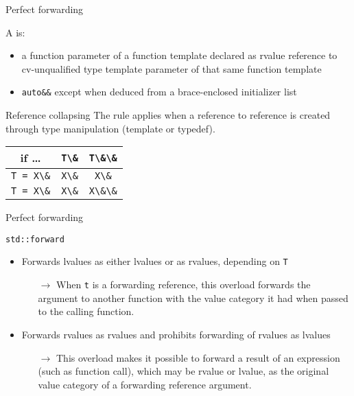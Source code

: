 \begin{frame}{Perfect forwarding}{}
  \begin{definition}
    A  is:
    \begin{itemize}
    \item
      a function parameter of a function template declared as rvalue reference to cv-unqualified type template parameter of that same function template
    \item
      \lstinline!auto&&! except when deduced from a brace-enclosed initializer list
    \end{itemize}
  \end{definition}
  \begin{block}{Reference collapsing}
    The  rule applies when a reference to reference is created through type manipulation (template or typedef).

    \begin{center}
      \begin{tabular}{|c||c|c|}
      \hline
        if \ldots          & \lstinline!T\&! & \lstinline!T\&\&!  \\
      \hline
      \hline
      \lstinline!T = X\&!  & \lstinline!X\&! & \lstinline!X\&!   \\
      \hline
      \lstinline!T = X\&!  & \lstinline!X\&! & \lstinline!X\&\&!  \\
      \hline
      \end{tabular}
    \end{center}
  \end{block}
\end{frame}

\begin{frame}{Perfect forwarding}{}
  \begin{block}{\texttt{std::forward}}
    \begin{itemize}
    \item
      Forwards lvalues as either lvalues or as rvalues, depending on \lstinline!T!
      \begin{itemize}
      \item[$\to$]
        When \lstinline!t! is a forwarding reference, this overload forwards the argument to another function with the value category it had when passed to the calling function.
      \end{itemize}
    \item
      Forwards rvalues as rvalues and prohibits forwarding of rvalues as lvalues
      \begin{itemize}
      \item[$\to$]
        This overload makes it possible to forward a result of an expression (such as function call), which may be rvalue or lvalue, as the original value category of a forwarding reference argument.
      \end{itemize}
    \end{itemize}
  \end{block}

  \small
\end{frame}

